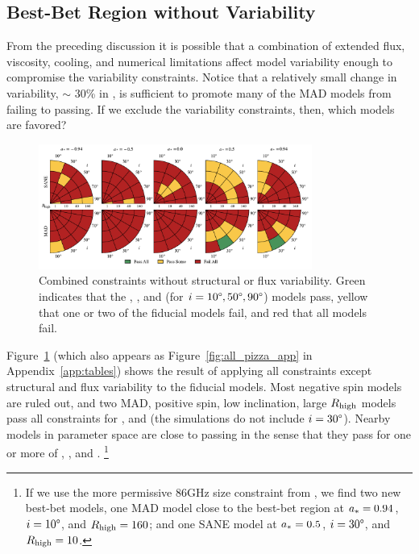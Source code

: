 \subsection{Best-Bet Region without Variability}

From the preceding discussion it is possible that a combination of extended flux, viscosity, cooling, and numerical limitations affect model variability enough to compromise the variability constraints.
Notice that a relatively small change in variability, $\sim$ 30\% in , is sufficient to promote many of the MAD models from failing to passing.
If we exclude the variability constraints, then, which models are favored?

\begin{figure}
  \centering
  \includegraphics[width=0.8\textwidth]{./figures/All_Constraints.pdf}
  \caption{Combined constraints without structural or flux variability.
Green indicates that the \kharma, \bhac, and (for $i = 10\degree, 50\degree, 90\degree$) \hamr models pass, yellow that one or two of the fiducial models fail, and red that all models fail.}
  \label{fig:all_pizza}
\end{figure}

Figure~\ref{fig:all_pizza} (which also appears as  Figure~\ref{fig:all_pizza_app} in Appendix~\ref{app:tables}) shows the result of applying all constraints except structural and flux variability to the fiducial models.
Most negative spin models are ruled out, and two MAD, positive spin, low inclination, large $R_\mathrm{high}$ models pass all constraints for \kharma, and \bhac (the \hamr simulations do not include $i = 30\degree$).
Nearby models in parameter space are close to passing in the sense that they pass for one or more of \kharma, \bhac, and \hamr. \footnote{If we use the more permissive 86GHz size constraint from \cite{2019ApJ...871...30I}, we find two new best-bet models, one MAD model close to the best-bet region at  $a_* = 0.94$, $i = 10 \degree$, and $R_\mathrm{high} = 160$; and one SANE model at $a_* = 0.5$, $i = 30 \degree$, and $R_\mathrm{high} = 10$.}


